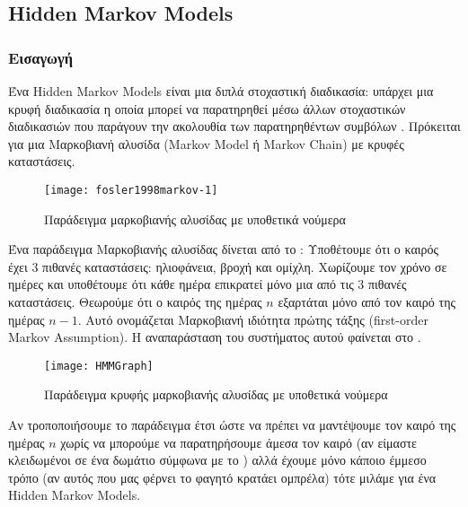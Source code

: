 \newcommand*{\hmm}{Hidden Markov Models}%
\subsection{\hmm{}}
\subsubsection{Εισαγωγή}
Ένα \hmm{} είναι μια διπλά στοχαστική διαδικασία:
υπάρχει μια κρυφή διαδικασία η οποία μπορεί να παρατηρηθεί μέσω άλλων στοχαστικών διαδικασιών που παράγουν την ακολουθία των παρατηρηθέντων συμβόλων \cite{rabiner1986introduction}.
Πρόκειται για μια Μαρκοβιανή αλυσίδα (Markov Model ή Markov Chain) με κρυφές καταστάσεις.

\begin{wrapfigure}[15]{r}{0.5\textwidth}
        \centering
        \vspace{-20pt}\texttt{[image: fosler1998markov-1]}
        \vspace{-20pt}\caption{Παράδειγμα μαρκοβιανής αλυσίδας με υποθετικά νούμερα \protect\cite{fosler1998markov}}
        \label{fig:fosler1998markov-1}
\end{wrapfigure}

Ένα παράδειγμα Μαρκοβιανής αλυσίδας δίνεται από το \cite{fosler1998markov}:
Υποθέτουμε ότι ο καιρός έχει 3 πιθανές καταστάσεις: ηλιοφάνεια, βροχή και ομίχλη.
Χωρίζουμε τον χρόνο σε ημέρες και υποθέτουμε ότι κάθε ημέρα επικρατεί μόνο μια από τις 3 πιθανές καταστάσεις.
Θεωρούμε ότι ο καιρός της ημέρας $n$ εξαρτάται μόνο από τον καιρό της ημέρας $n-1$.
Αυτό ονομάζεται Μαρκοβιανή ιδιότητα πρώτης τάξης (first-order Markov Assumption).
Η αναπαράσταση του συστήματος αυτού φαίνεται στο .

\begin{wrapfigure}[15]{r}{0.5\textwidth}
        \centering
        \vspace{-20pt}\texttt{[image: HMMGraph]}
        \vspace{-20pt}\caption{Παράδειγμα κρυφής μαρκοβιανής αλυσίδας με υποθετικά νούμερα \protect\cite{wikiHMM}}
        \label{fig:HMMGraph}
\end{wrapfigure}

Αν τροποποιήσουμε το παράδειγμα έτσι ώστε να πρέπει να μαντέψουμε τον καιρό της ημέρας $n$ χωρίς να μπορούμε να παρατηρήσουμε άμεσα τον καιρό (αν είμαστε κλειδωμένοι σε ένα δωμάτιο σύμφωνα με το \cite{fosler1998markov})
αλλά έχουμε μόνο κάποιο έμμεσο τρόπο (αν αυτός που μας φέρνει το φαγητό κρατάει ομπρέλα) τότε μιλάμε για ένα \hmm{}.

